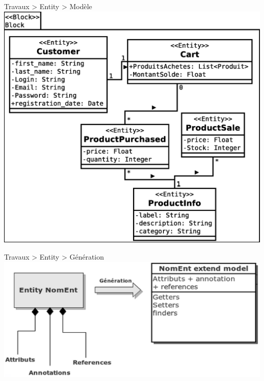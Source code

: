 \documentclass[HeilHazel,pdf,final,colorBG,slideColor]{prosper}
\begin{document}
\begin{slide}{Travaux > Entity > Modèle}
  \vspace{-1cm}
  \bc{}
    \includegraphics[scale=.33]{img/entity_model.eps} 
  \ec{}
\end{slide}


\begin{slide}{Travaux > Entity > Génération}
  \bc{}
    \includegraphics[scale=.4]{img/entity_gen.eps} 
  \ec{}
\end{slide}
\end{document}
